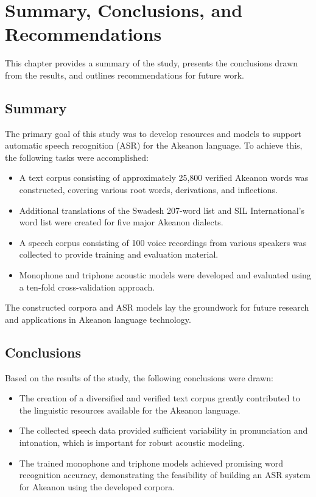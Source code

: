 \chapter{Summary, Conclusions, and Recommendations}

This chapter provides a summary of the study, presents the conclusions drawn from the results, and outlines recommendations for future work.

\section{Summary}

The primary goal of this study was to develop resources and models to support automatic speech recognition (ASR) for the Akeanon language. To achieve this, the following tasks were accomplished:
\begin{itemize}
    \item A text corpus consisting of approximately 25,800 verified Akeanon words was constructed, covering various root words, derivations, and inflections.
    \item Additional translations of the Swadesh 207-word list and SIL International's word list were created for five major Akeanon dialects.
    \item A speech corpus consisting of 100 voice recordings from various speakers was collected to provide training and evaluation material.
    \item Monophone and triphone acoustic models were developed and evaluated using a ten-fold cross-validation approach.
\end{itemize}

The constructed corpora and ASR models lay the groundwork for future research and applications in Akeanon language technology.

\section{Conclusions}

Based on the results of the study, the following conclusions were drawn:
\begin{itemize}
    \item The creation of a diversified and verified text corpus greatly contributed to the linguistic resources available for the Akeanon language.
    \item The collected speech data provided sufficient variability in pronunciation and intonation, which is important for robust acoustic modeling.
    \item The trained monophone and triphone models achieved promising word recognition accuracy, demonstrating the feasibility of building an ASR system for Akeanon using the developed corpora.
\end{itemize}

